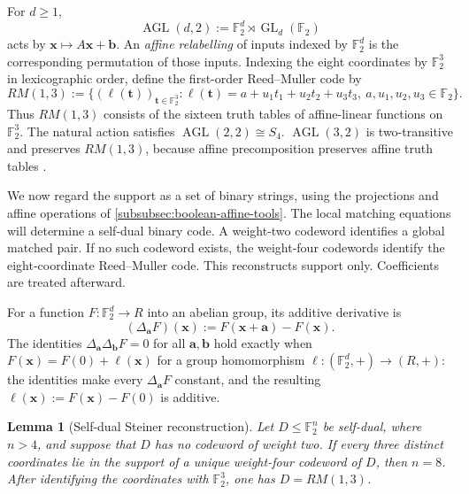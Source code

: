 \documentclass[11pt,letterpaper,onecolumn]{article}
\theoremstyle{plain}
\newtheorem{lemma}[lemma]{Lemma}
\theoremstyle{definition}
\theoremstyle{remark}
\newcommand{\Ftwo}{\mathbb F_2}
\newcommand{\GL}{\operatorname{GL}}
\begin{document}
\label{par:reed-muller-code}

For \(d\ge1\),
\[
 \operatorname{AGL}(d,2):=\Ftwo^d\rtimes\GL_d(\Ftwo)
\]
acts by \({\mathbf{x}}\mapsto A{\mathbf{x}}+{\mathbf{b}}\).  An \emph{affine relabelling} of inputs indexed by
\(\Ftwo^d\) is the corresponding permutation of those inputs.  Indexing the
eight coordinates by \(\Ftwo^3\) in lexicographic order, define the
first-order Reed--Muller code by
\[
 RM(1,3):=
 \{(\ell({\mathbf{t}}))_{{\mathbf{t}}\in\Ftwo^3}:
   \ell({\mathbf{t}})=a+u_1t_1+u_2t_2+u_3t_3,\ 
   a,u_1,u_2,u_3\in\Ftwo\}.
\]
Thus \(RM(1,3)\) consists of the sixteen truth tables of affine-linear
functions on \(\Ftwo^3\).  The natural action satisfies
\(\operatorname{AGL}(2,2)\cong S_4\).
\(\operatorname{AGL}(3,2)\) is two-transitive and preserves \(RM(1,3)\),
because affine precomposition preserves affine truth tables
\cite[Section~4.1]{Carlet2021}.

We now regard the support as a set of binary strings, using the projections
and affine operations of \cref{subsubsec:boolean-affine-tools}.  The
local matching equations will determine a self-dual binary code.  A
weight-two codeword identifies a global matched pair. If no such codeword
exists, the weight-four codewords identify the eight-coordinate Reed--Muller
code.  This reconstructs support only. Coefficients are treated afterward.

For a function
\(F:\Ftwo^d\to R\) into an abelian group, its additive derivative is
\[
 (\Delta_{\mathbf{a}}F)({\mathbf{x}}):=F({\mathbf{x}}+{\mathbf{a}})-F({\mathbf{x}}).
\]
The identities \(\Delta_{\mathbf{a}}\Delta_{\mathbf{b}}F=0\) for all \({\mathbf{a}},{\mathbf{b}}\) hold exactly when
\(F({\mathbf{x}})=F(0)+\ell({\mathbf{x}})\) for a group homomorphism
\(\ell:(\Ftwo^d,+)\to(R,+)\): the identities make every
\(\Delta_{\mathbf{a}}F\) constant, and the resulting
\(\ell({\mathbf{x}}):=F({\mathbf{x}})-F(0)\) is additive.

\begin{lemma}[Self-dual Steiner reconstruction]
\label{lem:self-dual-steiner-reconstruction}
Let \(D\le\Ftwo^n\) be self-dual, where \(n>4\), and suppose that \(D\)
has no codeword of weight two.  If every three distinct coordinates lie in the
support of a unique weight-four codeword of \(D\), then \(n=8\). After
identifying the coordinates with \(\Ftwo^3\), one has \(D=RM(1,3)\).
\end{lemma}
\end{document}
